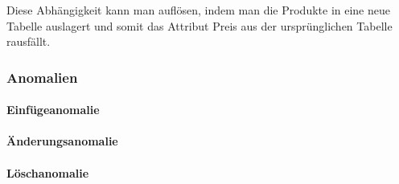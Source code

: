Diese Abhängigkeit kann man auflösen, indem man die Produkte in eine neue Tabelle auslagert und somit das Attribut Preis aus der ursprünglichen Tabelle rausfällt.

\subsubsection{Anomalien}

\paragraph{Einfügeanomalie}

\paragraph{Änderungsanomalie}

\paragraph{Löschanomalie}